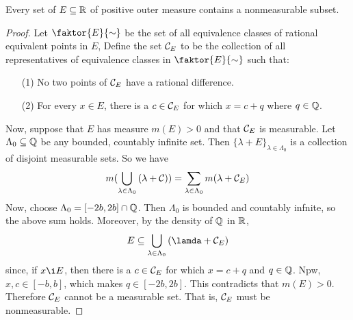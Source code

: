 \begin{theorem}\label{8.5.3}
    Every set of $E \subseteq \mathbb{R}$ of positive outer measure contains a
    nonmeasurable subset.
\end{theorem}
\begin{proof}
    Let $\faktor{E}{\sim}$ be the set of all equivalence classes of rational
    equivalent points in $E$, Define the set $\mathcal{C}_E$ to be the collection of all
    representatives of equivalence classes in  $\faktor{E}{\sim}$ such that:
    \begin{enumerate}
        \item[(1)] No two points of $\mathcal{C}_E$ have a rational difference.

        \item[(2)] For every $x \in E$, there is a  $c \in \mathcal{C}_E$ for which
            $x=c+q$ where $q \in \mathbb{Q}$.
    \end{enumerate}

    Now, suppose that $E$ has measure  $m(E)>0$ and that $\mathcal{C}_E$ is measurable.
    Let  $\Lambda_0 \subseteq \mathbb{Q}$ be any bounded, countably infinite set. Then
    $\{\lambda+E\}_{\lambda \in \Lambda_0}$ is a collection of disjoint
    measurable sets. So we have
    \begin{equation*}
        m(\bigcup_{\lambda \in \Lambda_0}{(\lambda+\mathcal{C})})=
        \sum_{\lambda \in \Lambda_0}{m(\lambda+\mathcal{C}_E)}
    \end{equation*}
    Now, choose $\Lambda_0=[-2b,2b] \cap \mathbb{Q}$. Then $\Lambda_0$ is bounded and
    countably infnite, so the above sum holds. Moreover, by the density of $\mathbb{Q}$
   in  $\mathbb{R}$,
    \begin{equation*}
        E \subseteq \bigcup_{\lambda \in \Lambda_0}{(\lamda+\Cc_E)}
    \end{equation*}
    since, if $x \i E$, then there is a  $c \in \mathcal{C}_E$ for which  $x=c+q$ and
    $q \in \mathbb{Q}$. Npw,  $x,c \in [-b,b]$, which makes $q \in [-2b,2b]$. This
    contradicts that $m(E)>0$. Therefore $\mathcal{C}_E$ cannot be a measurable set.
    That is,  $\mathcal{C}_E$ must be nonmeasurable.
\end{proof}
